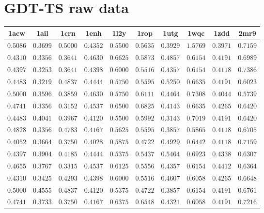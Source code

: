 \chapter{GDT-TS raw data}\label{appendix:gdtts-data}

\centering
\begin{longtable}{c|c|c|c|c|c|c|c|c|c}
    1acw & 1ail & 1crn & 1enh & 1l2y & 1rop & 1utg & 1wqc & 1zdd & 2mr9 \\ \hline
    $0.5086$ & $0.3699$ & $0.5000$ & $0.4352$ & $0.5500$ & $0.5635$ & $0.3929$ & $1.5769$ & $0.3971$ & $0.7159$ \\ \hline
    $0.4310$ & $0.3356$ & $0.3641$ & $0.4630$ & $0.6625$ & $0.5873$ & $0.4857$ & $0.6154$ & $0.4191$ & $0.6989$ \\ \hline
    $0.4397$ & $0.3253$ & $0.3641$ & $0.4398$ & $0.6000$ & $0.5516$ & $0.4357$ & $0.6154$ & $0.4118$ & $0.7386$ \\ \hline
    $0.4483$ & $0.3219$ & $0.4837$ & $0.4444$ & $0.5750$ & $0.5595$ & $0.5250$ & $0.6635$ & $0.4191$ & $0.6023$ \\ \hline
    $0.5000$ & $0.3596$ & $0.3859$ & $0.4630$ & $0.5750$ & $0.6111$ & $0.4464$ & $0.7308$ & $0.4044$ & $0.5739$ \\ \hline
    $0.4741$ & $0.3356$ & $0.3152$ & $0.4537$ & $0.6500$ & $0.6825$ & $0.4143$ & $0.6635$ & $0.4265$ & $0.6420$ \\ \hline
    $0.4483$ & $0.4041$ & $0.3967$ & $0.4120$ & $0.5500$ & $0.5992$ & $0.3143$ & $0.7019$ & $0.4191$ & $0.6420$ \\ \hline
    $0.4828$ & $0.3356$ & $0.4783$ & $0.4167$ & $0.5625$ & $0.5595$ & $0.3857$ & $0.5865$ & $0.4118$ & $0.6705$ \\ \hline
    $0.4052$ & $0.3664$ & $0.3750$ & $0.4028$ & $0.5875$ & $0.4722$ & $0.4929$ & $0.6442$ & $0.4118$ & $0.7159$ \\ \hline
    $0.4397$ & $0.3904$ & $0.4185$ & $0.4444$ & $0.5375$ & $0.5437$ & $0.5464$ & $0.6923$ & $0.4338$ & $0.6307$ \\ \hline
    $0.4655$ & $0.3767$ & $0.3315$ & $0.4537$ & $0.6125$ & $0.5556$ & $0.4357$ & $0.6154$ & $0.4412$ & $0.6364$ \\ \hline
    $0.4310$ & $0.3425$ & $0.4293$ & $0.4398$ & $0.6000$ & $0.5516$ & $0.4607$ & $0.6058$ & $0.4265$ & $0.6648$ \\ \hline
    $0.5000$ & $0.4555$ & $0.4837$ & $0.4120$ & $0.5375$ & $0.4722$ & $0.3857$ & $0.6154$ & $0.4191$ & $0.6761$ \\ \hline
    $0.4741$ & $0.3733$ & $0.3750$ & $0.4167$ & $0.6375$ & $0.6548$ & $0.4321$ & $0.6058$ & $0.4191$ & $0.7216$ \\ \hline

\end{longtable}
